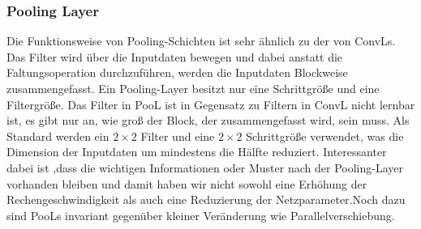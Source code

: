 \documentclass[12pt,a4paper]{scrartcl}
\numberwithin{equation}{section}
\begin{document}
\subsubsection{Pooling Layer}\label{Pooling Layer}
Die Funktionsweise von Pooling-Schichten ist sehr ähnlich zu der von \acsp{ConvL}. Das Filter wird über die Inputdaten bewegen und dabei anstatt die Faltungsoperation durchzuführen, werden die Inputdaten Blockweise zusammengefasst. Ein Pooling-Layer besitzt nur eine Schrittgröße und eine Filtergröße. Das Filter in PooL ist in Gegensatz zu Filtern in ConvL nicht lernbar ist, es gibt nur an, wie groß der Block, der zusammengefasst wird, sein muss.
Als Standard werden ein $ 2 \times 2 $ Filter und eine $ 2 \times 2 $ Schrittgröße verwendet, was die Dimension der Inputdaten um mindestens die Hälfte reduziert. Interessanter dabei ist ,dass die wichtigen Informationen oder Muster nach der Pooling-Layer vorhanden bleiben und damit haben wir nicht sowohl eine Erhöhung der Rechengeschwindigkeit als auch eine Reduzierung der Netzparameter.Noch dazu sind \acsp{PooL}  invariant gegenüber kleiner Veränderung wie Parallelverschiebung.
\end{document}
